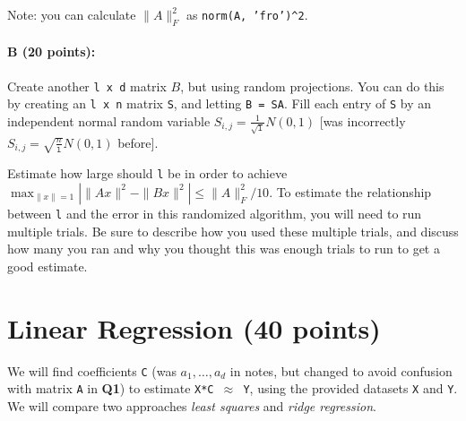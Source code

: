 \documentclass[11pt]{article}
\begin{document}
Note: you can calculate $\|A\|_F^2$ as \texttt{norm(A, 'fro')\^{}2}.  




\paragraph{B (20 points):}
Create another \texttt{l x d} matrix $B$, but using random projections.  You can do this by creating an \texttt{l x n} matrix \texttt{S}, and letting \texttt{B = SA}.  Fill each entry of \texttt{S} by an independent normal random variable {\color{red} $S_{i,j} = \frac{1}{\sqrt{\texttt{l}}} N(0,1)$}  {\color{blue} [was incorrectly $S_{i,j} = \sqrt{\frac{n}{\texttt{l}}} N(0,1)$ before]}.  

Estimate how large should \texttt{l} be in order to achieve $\max_{\|x\|=1} | \|A x\|^2 - \|B x\|^2 | \leq \|A\|_F^2/10$.  To estimate the relationship between \texttt{l} and the error in this randomized algorithm, you will need to run multiple trials.  Be sure to describe how you used these multiple trials, and discuss how many you ran and why you thought this was enough trials to run to get a good estimate.  




\section{Linear Regression (40 points)}

We will find coefficients \texttt{C} (was $a_1, \ldots, a_d$ in notes, but changed to avoid confusion with matrix \texttt{A} in {\bf{\sffamily Q1}}) to estimate \texttt{X*C $\approx$ Y}, using the provided datasets \texttt{X} and \texttt{Y}.  We will compare two approaches \emph{least squares} and \emph{ridge regression}.  
\end{document}

